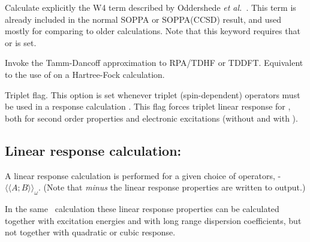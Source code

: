 \begin{description}
\item{}
Calculate explicitly the W4 term described by Oddershede {\it et
al.\/}~\cite{jopjdycpr2}. This term is already included in the normal
SOPPA or
SOPPA(CCSD) result, and used mostly for comparing to older
calculations. Note that this keyword requires that  or
is set.

\item{}
Invoke the Tamm-Dancoff approximation to RPA/TDHF or TDDFT. Equivalent to the
use of  on a Hartree-Fock calculation.

\item{}
Triplet flag. This option is set whenever triplet
(spin-dependent)
operators must be used in a response calculation
\cite{jodlypjjcp91,ovhapjhjajthjojcp97}.
This flag forces triplet linear response for ,
both for second order properties and electronic excitations
(without and with ).

\end{description}

\subsection{Linear response calculation: }
\label{sec:linearrsp}

A linear response
\cite{jodlypjjcp91,pjhjajjojcp89} calculation is performed for a given
choice of operators,
-$\langle\!\langle A; B \rangle\!\rangle_{\omega}$.
(Note that {\em minus} the linear response properties are written to output.)

In the same \resp\ calculation these linear response properties can be calculated
together with excitation energies
and with long range dispersion coefficients, but not
together with quadratic or cubic response.

